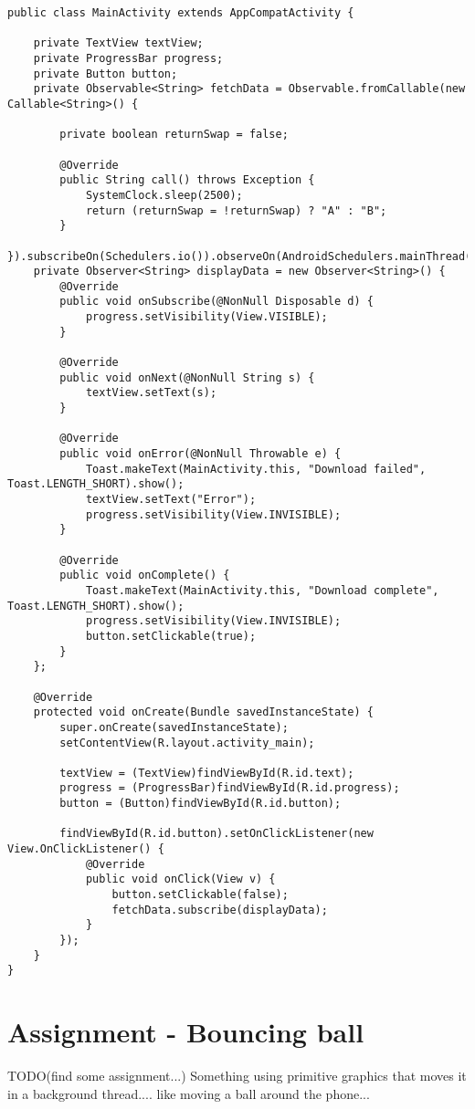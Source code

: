 \begin{lstlisting}[style=A_Java]
public class MainActivity extends AppCompatActivity {

    private TextView textView;
    private ProgressBar progress;
    private Button button;
    private Observable<String> fetchData = Observable.fromCallable(new Callable<String>() {

        private boolean returnSwap = false;

        @Override
        public String call() throws Exception {
            SystemClock.sleep(2500);
            return (returnSwap = !returnSwap) ? "A" : "B";
        }
    }).subscribeOn(Schedulers.io()).observeOn(AndroidSchedulers.mainThread());
    private Observer<String> displayData = new Observer<String>() {
        @Override
        public void onSubscribe(@NonNull Disposable d) {
            progress.setVisibility(View.VISIBLE);
        }

        @Override
        public void onNext(@NonNull String s) {
            textView.setText(s);
        }

        @Override
        public void onError(@NonNull Throwable e) {
            Toast.makeText(MainActivity.this, "Download failed", Toast.LENGTH_SHORT).show();
            textView.setText("Error");
            progress.setVisibility(View.INVISIBLE);
        }

        @Override
        public void onComplete() {
            Toast.makeText(MainActivity.this, "Download complete", Toast.LENGTH_SHORT).show();
            progress.setVisibility(View.INVISIBLE);
            button.setClickable(true);
        }
    };

    @Override
    protected void onCreate(Bundle savedInstanceState) {
        super.onCreate(savedInstanceState);
        setContentView(R.layout.activity_main);

        textView = (TextView)findViewById(R.id.text);
        progress = (ProgressBar)findViewById(R.id.progress);
        button = (Button)findViewById(R.id.button);

        findViewById(R.id.button).setOnClickListener(new View.OnClickListener() {
            @Override
            public void onClick(View v) {
                button.setClickable(false);
                fetchData.subscribe(displayData);
            }
        });
    }
}
\end{lstlisting}

\section{Assignment - Bouncing ball}
{\Huge TODO(find some assignment...)}
Something using primitive graphics that moves it in a background thread.... like moving a ball around the phone...



